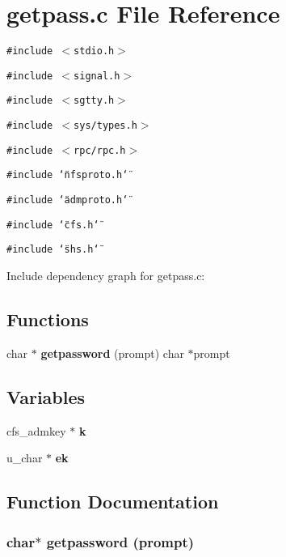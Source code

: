 \section{getpass.c File Reference}
\label{getpass_8c}


{\tt \#include $<$stdio.h$>$}\par
{\tt \#include $<$signal.h$>$}\par
{\tt \#include $<$sgtty.h$>$}\par
{\tt \#include $<$sys/types.h$>$}\par
{\tt \#include $<$rpc/rpc.h$>$}\par
{\tt \#include \char`\"{}nfsproto.h\char`\"{}}\par
{\tt \#include \char`\"{}admproto.h\char`\"{}}\par
{\tt \#include \char`\"{}cfs.h\char`\"{}}\par
{\tt \#include \char`\"{}shs.h\char`\"{}}\par


Include dependency graph for getpass.c:\subsection*{Functions}
\begin{CompactItemize}
\item 
char $\ast$ {\bf getpassword} (prompt) char $\ast$prompt
\end{CompactItemize}
\subsection*{Variables}
\begin{CompactItemize}
\item 
cfs\_\-admkey $\ast$ {\bf k}
\item 
u\_\-char $\ast$ {\bf ek}
\end{CompactItemize}


\subsection{Function Documentation}
\subsubsection{\setlength{\rightskip}{0pt plus 5cm}char$\ast$ getpassword (prompt)}\label{getpass_8c_a2}




